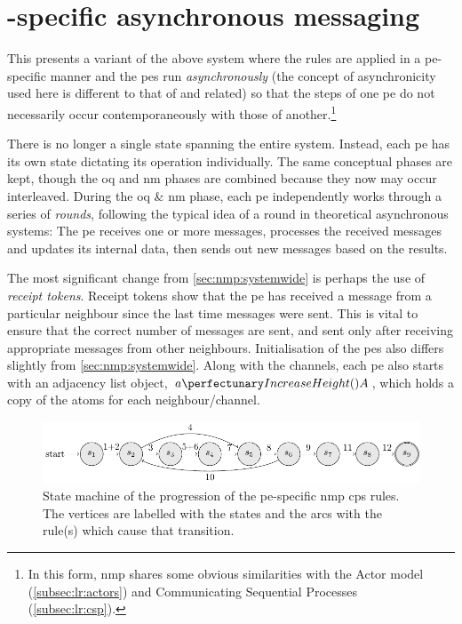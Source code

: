 \section{\label{sec:nmp:pespecific}\texorpdfstring{}{Proxel}-specific asynchronous messaging}

This  presents a variant of the above system where the rules are applied in a \gls{pe}-specific manner and the \glspl{pe} run \emph{asynchronously} \cite{Balanescu2011,Nicolescu2014} (the concept of asynchronicity used here is different to that of \cite{Cavaliere2009,Frisco2012,Song2013} and related) so that the steps of one \gls{pe} do not necessarily occur contemporaneously with those of another.\footnote{In this form, \gls{nmp} shares some obvious similarities with the Actor model (\cref{subsec:lr:actors}) and Communicating Sequential Processes (\cref{subsec:lr:csp}).}  

There is no longer a single state spanning the entire system.  Instead, each \gls{pe} has its own state dictating its operation individually.  The same conceptual phases are kept, though the \gls{oq} and \gls{nm} phases are combined because they now may occur interleaved.  During the \gls{oq} \& \gls{nm} phase, each \gls{pe} independently works through a series of \label{pg:nmp:rounds}\emph{rounds}, following the typical idea of a round in theoretical asynchronous systems:  The \gls{pe} receives one or more messages, processes the received messages and updates its internal data, then sends out new messages based on the results.

The most significant change from \cref{sec:nmp:systemwide} is perhaps the use of \emph{receipt tokens}.  Receipt tokens show that the \gls{pe} has received a message from a particular neighbour since the last time messages were sent.  This is vital to ensure that the correct number of messages are sent, and sent only after receiving appropriate messages from other neighbours.  Initialisation of the \glspl{pe} also differs slightly from \cref{sec:nmp:systemwide}.  Along with the channels, each \gls{pe} also starts with an adjacency list object, \(\cpfunc{a}{A}\), which holds a copy of the atoms for each neighbour/channel.

\begin{figure}
    \centering
    \includegraphics[width=1.0\textwidth]{chapters/nmp/images/proxelspecificstatemachine.pdf}
    \caption[State machine of the progression of the -specific  \gls{cps} rules]{State machine of the progression of the \gls{pe}-specific \gls{nmp} \gls{cps} rules.  The vertices are labelled with the states and the arcs with the rule(s) which cause that transition.}
    \label{fig:nmp:proxelspecificstatemachine}
\end{figure}

